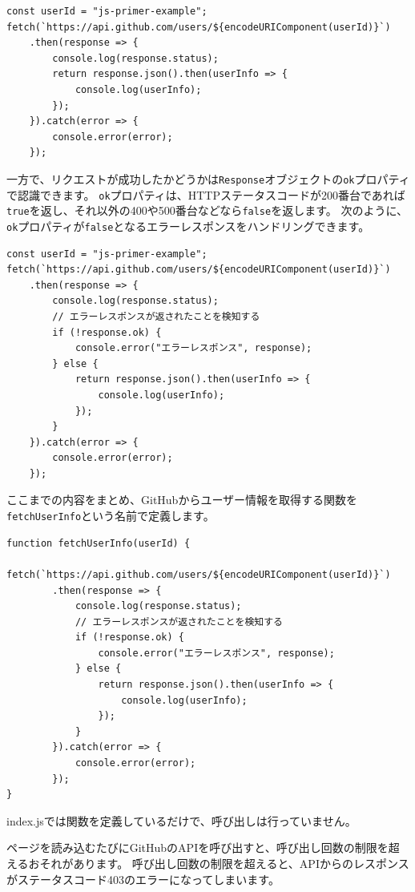 \begin{lstlisting}
const userId = "js-primer-example";
fetch(`https://api.github.com/users/${encodeURIComponent(userId)}`)
    .then(response => {
        console.log(response.status);
        return response.json().then(userInfo => {
            console.log(userInfo);
        });
    }).catch(error => {
        console.error(error);
    });
\end{lstlisting}

一方で、リクエストが成功したかどうかは\texttt{Response}オブジェクトの\texttt{ok}プロパティで認識できます。
\texttt{ok}プロパティは、HTTPステータスコードが200番台であれば\texttt{true}を返し、それ以外の400や500番台などなら\texttt{false}を返します。
次のように、\texttt{ok}プロパティが\texttt{false}となるエラーレスポンスをハンドリングできます。

\begin{lstlisting}
const userId = "js-primer-example";
fetch(`https://api.github.com/users/${encodeURIComponent(userId)}`)
    .then(response => {
        console.log(response.status); 
        // エラーレスポンスが返されたことを検知する
        if (!response.ok) {
            console.error("エラーレスポンス", response);
        } else {
            return response.json().then(userInfo => {
                console.log(userInfo);
            });
        }
    }).catch(error => {
        console.error(error);
    });
\end{lstlisting}

ここまでの内容をまとめ、GitHubからユーザー情報を取得する関数を\texttt{fetchUserInfo}という名前で定義します。

\begin{lstlisting}
function fetchUserInfo(userId) {
    fetch(`https://api.github.com/users/${encodeURIComponent(userId)}`)
        .then(response => {
            console.log(response.status);
            // エラーレスポンスが返されたことを検知する
            if (!response.ok) {
                console.error("エラーレスポンス", response);
            } else {
                return response.json().then(userInfo => {
                    console.log(userInfo);
                });
            }
        }).catch(error => {
            console.error(error);
        });
}
\end{lstlisting}

index.jsでは関数を定義しているだけで、呼び出しは行っていません。

ページを読み込むたびにGitHubのAPIを呼び出すと、呼び出し回数の制限を超えるおそれがあります。
呼び出し回数の制限を超えると、APIからのレスポンスがステータスコード403のエラーになってしまいます。

